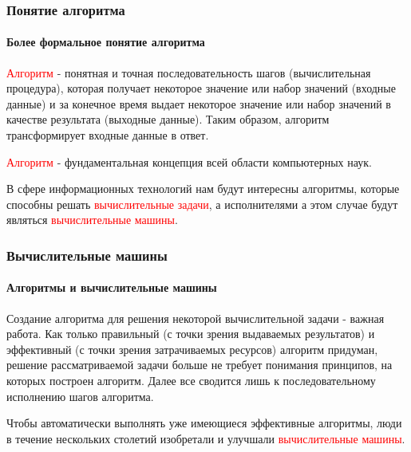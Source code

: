 \documentclass[aspectratio=169]{beamer}
\begin{document}
\begin{frame}
\frametitle{Понятие алгоритма}
\framesubtitle{Более формальное понятие алгоритма}
\justifying
\textcolor{red} {Алгоритм} - понятная и точная последовательность шагов (вычислительная процедура), которая получает некоторое значение или набор значений (входные данные) и за конечное время выдает некоторое значение или набор значений в качестве результата (выходные данные). \newline\newline
Таким образом, алгоритм трансформирует входные данные в ответ.\newline

\textcolor{red} {Алгоритм} - фундаментальная концепция всей области компьютерных наук.\newline

В сфере информационных технологий нам будут интересны алгоритмы, которые способны решать \textcolor{red}{вычислительные задачи}, а исполнителями а этом случае будут являться \textcolor{red}{вычислительные машины}.

\end{frame}

\begin{frame}
\frametitle{Вычислительные машины}
\framesubtitle{Алгоритмы и вычислительные машины}

Создание алгоритма для решения некоторой вычислительной задачи - важная работа. \newline \newline Как только правильный (с точки зрения выдаваемых результатов) и эффективный (с точки зрения затрачиваемых ресурсов) алгоритм придуман, решение рассматриваемой задачи больше не требует понимания принципов, на которых построен алгоритм. Далее все сводится лишь к последовательному исполнению шагов алгоритма.\newline

Чтобы автоматически выполнять уже имеющиеся эффективные алгоритмы, люди в течение нескольких столетий изобретали и улучшали \textcolor{red}{вычислительные машины}.


\end{frame}
\end{document}
